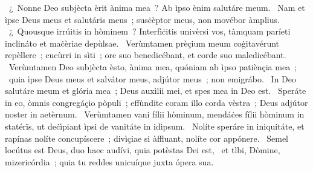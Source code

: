 \psalmChapterWithInscription{}
{ }
{%
~¿~Nonne Deo subjècta èrit ànima mea~? Ab ìpso ènim salutáre meum. 
~Nam et ìpse Deus meus et salutáris meus~; susċèptor meus, non movébor àmplius. 
~¿~Quousque irrúitis in hòminem~? Interfìċitis univèrsi vos, tàmquam paríeti inclináto et maċèriae depùlsae. 
~Verùmtamen prèçium meum coġitavérunt repèllere~; cucùrri in sìti~; ore suo benedicébant, et corde suo maledicébant. 
~Verùmtamen Deo subjècta èsto, ànima mea, quóniam ab ìpso patiènçia mea~; 
~quia ìpse Deus meus et salvátor meus, adjútor meus~; non emigrábo. 
~In Deo salutáre meum et glória mea~; Deus auxìlii mei, et spes mea in Deo est. 
~Speráte in eo, òmnis congregáçio pòpuli~; effùndite coram illo corda vèstra~; Deus adjútor noster in aetèrnum. 
~Verùmtamen vani fílii hòminum, mendáċes fílii hòminum in statérïs, ut deċìpiant ìpsi de vanitáte in idìpsum. 
~Nolíte speráre in iniquitáte, et rapínas nolíte concupíscere~; divìçiae si àffluant, nolíte cor appónere. 
~Semel locútus est Deus, duo haec audívi, quia potèstas Dei est, 
~et tìbi, Dòmine, mizericórdia~; quia tu reddes unicuíque juxta ópera sua. 
}
